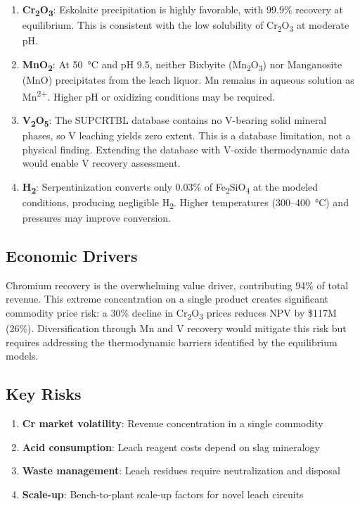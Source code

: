 \documentclass[11pt,a4paper]{article}
\begin{document}
\begin{enumerate}
  \item \textbf{Cr\textsubscript{2}O\textsubscript{3}}: Eskolaite
    precipitation is highly favorable, with 99.9\% recovery at
    equilibrium. This is consistent with the low solubility of
    Cr\textsubscript{2}O\textsubscript{3} at moderate pH.
  \item \textbf{MnO\textsubscript{2}}: At \SI{50}{\degreeCelsius}
    and pH 9.5, neither Bixbyite (Mn\textsubscript{2}O\textsubscript{3})
    nor Manganosite (MnO) precipitates from the leach liquor.
    Mn remains in aqueous solution as Mn\textsuperscript{2+}.
    Higher pH or oxidizing conditions may be required.
  \item \textbf{V\textsubscript{2}O\textsubscript{5}}: The SUPCRTBL
    database contains no V-bearing solid mineral phases, so V leaching
    yields zero extent. This is a database limitation, not a physical
    finding.  Extending the database with V-oxide thermodynamic data
    would enable V recovery assessment.
  \item \textbf{H\textsubscript{2}}: Serpentinization converts only
    0.03\% of Fe\textsubscript{2}SiO\textsubscript{4} at the modeled
    conditions, producing negligible H\textsubscript{2}. Higher
    temperatures (300--\SI{400}{\degreeCelsius}) and pressures may
    improve conversion.
\end{enumerate}

\subsection{Economic Drivers}

Chromium recovery is the overwhelming value driver, contributing 94\% of
total revenue. This extreme concentration on a single product creates
significant commodity price risk: a 30\% decline in Cr\textsubscript{2}O\textsubscript{3}
prices reduces NPV by \$117M (26\%).  Diversification through Mn and V
recovery would mitigate this risk but requires addressing the thermodynamic
barriers identified by the equilibrium models.

\subsection{Key Risks}

\begin{enumerate}[leftmargin=*]
\item \textbf{Cr market volatility}: Revenue concentration in a single commodity
\item \textbf{Acid consumption}: Leach reagent costs depend on slag mineralogy
\item \textbf{Waste management}: Leach residues require neutralization and disposal
\item \textbf{Scale-up}: Bench-to-plant scale-up factors for novel leach circuits
\end{enumerate}
\end{document}
